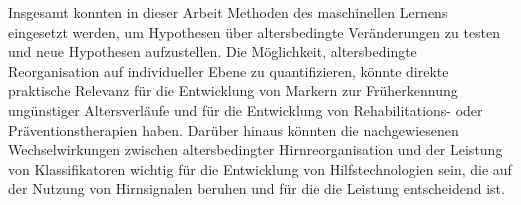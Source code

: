 Insgesamt konnten in dieser Arbeit Methoden des maschinellen Lernens eingesetzt werden, um Hypothesen über altersbedingte Veränderungen zu testen und neue Hypothesen aufzustellen. Die Möglichkeit, altersbedingte Reorganisation auf individueller Ebene zu quantifizieren, könnte direkte praktische Relevanz für die Entwicklung von Markern zur Früherkennung ungünstiger Altersverläufe und für die Entwicklung von Rehabilitations- oder Präventionstherapien haben. Darüber hinaus könnten die nachgewiesenen Wechselwirkungen zwischen altersbedingter Hirnreorganisation und der Leistung von Klassifikatoren wichtig für die Entwicklung von Hilfstechnologien sein, die auf der Nutzung von Hirnsignalen beruhen und für die die Leistung entscheidend ist.